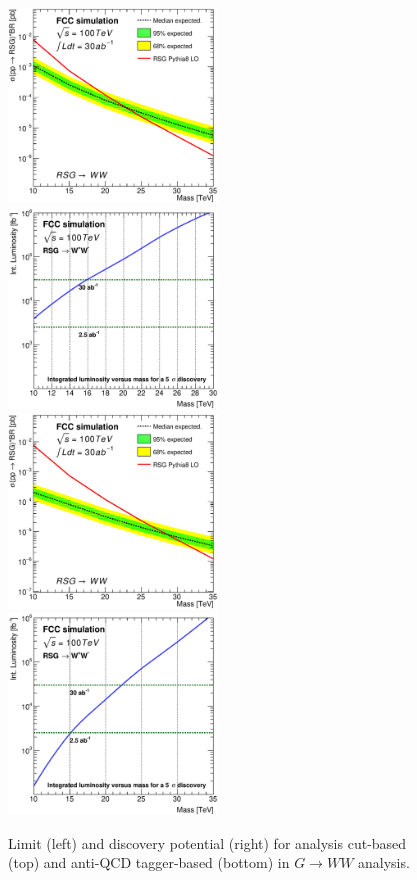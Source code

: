 \documentclass{cernrep}
\begin{document}
\begin{figure}[!htb]\centering
\includegraphics[width=0.495\textwidth]{Fig/RSGww/lim_RSGraviton_ww_fcc_v02_cut.eps}
\includegraphics[width=0.495\textwidth]{Fig/RSGww/DiscoveryPotential_ww_cut_rootStyle.eps}
\includegraphics[width=0.495\textwidth]{Fig/RSGww/lim_RSGraviton_ww_fcc_v02_tagger.eps}
\includegraphics[width=0.495\textwidth]{Fig/RSGww/DiscoveryPotential_ww_tagger_rootStyle.eps}
\caption{Limit (left) and discovery potential (right) for analysis cut-based (top) and anti-QCD tagger-based (bottom) in $G \rightarrow WW$ analysis.}
\label{fig:RSWww_limit}
\end{figure}

\clearpage
\newpage



\end{document}
